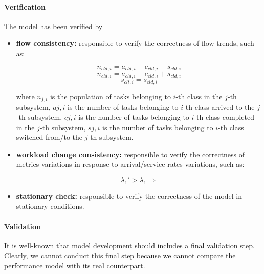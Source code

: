 \paragraph{Verification}
The model has been verified by 
\begin{itemize}
	\item \textbf{flow consistency:} responsible to verify the correctness of flow trends, such as:
	
	\begin{equation}
	n_{cld,i}=a_{cld,i}-c_{cld,i}-s_{cld,i}
	\end{equation}
	\begin{equation}
	n_{cld,i}=a_{cld,i}-c_{cld,i}+s_{cld,i}
	\end{equation}
	\begin{equation}
	s_{clt,i}=s_{cld,i}
	\end{equation}
	
	 where 
	 $n_{j,i}$ is the population of tasks belonging to $i$-th class in the $j$-th subsystem, 
	 $a{j,i}$ is the number of tasks belonging to $i$-th class arrived to the $j$-th subsystem, 
	 $c{j,i}$ is the number of tasks belonging to $i$-th class completed in the $j$-th subsystem, 
	 $s{j,i}$ is the number of tasks belonging to $i$-th class switched from/to the $j$-th subsystem.
	 
	\item \textbf{workload change consistency:} responsible to verify the correctness of metrics variations in response to arrival/service rates variations, such as:
	
	\begin{equation}
		\lambda_{1}' > \lambda_{1} \Rightarrow
	\end{equation}
	
	\item \textbf{stationary check:} responsible to verify the correctness of the model in stationary conditions.
\end{itemize}

\paragraph{Validation}
It is well-known that model development should includes a final validation step. Clearly, we cannot conduct this final step because we cannot compare the performance model with its real counterpart.